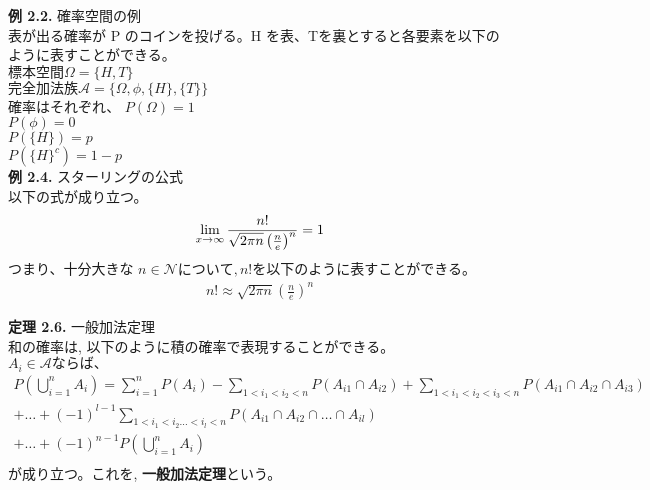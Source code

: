 \documentclass[dvipdfmx,10pt, a4j]{jarticle}
\theoremstyle{definition}
\begin{document}
    \newpage
    \noindent
    \textbf{例 2.2.} 確率空間の例\\
    表が出る確率が P のコインを投げる。H を表、Tを裏とすると各要素を以下のように表すことができる。\\
    $標本空間 \Omega = \{ H, T \}$\\
    $完全加法族 \mathcal{A} = \{ \Omega, \phi, \{H\}, \{T\} \}$\\

    確率はそれぞれ、
    $P(\Omega) = 1$\\
    $P(\phi) = 0$\\
    $P(\{H\}) = p$\\
    $P(\{H\}^{c}) = 1-p$\\

    \noindent
    \textbf{例 2.4.} スターリングの公式\\
    以下の式が成り立つ。\\
    \[
        \lim_{x \to \infty} \frac{n!}{\sqrt{2 \pi n}\left(\frac{n}{e}\right)^{n}} = 1\\
    \]
    つまり、十分大きな $n \in \mathcal{N} について, n!$を以下のように表すことができる。
    \begin{align}
        n! \approx \sqrt{2 \pi n}\left(\frac{n}{e}\right)^{n}
    \end{align}

    \noindent
    \textbf{定理 2.6.} 一般加法定理\\
    和の確率は, 以下のように積の確率で表現することができる。\\
    $A_i \in \mathcal{A} ならば、$\\
    \begin{align*}
        P(\bigcup_{i=1}^{n}{A_i}) = \sum_{i = 1}^n P(A_i) - \sum_{1 < i_1 < i_2 < n} P(A_{i1} \cap A_{i2}) + \sum_{1 < i_1 < i_2 < i_3 < n} P(A_{i1} \cap A_{i2} \cap A_{i3}) \\
        + \dots + (-1)^{l-1} \sum_{1 < i_1 < i_2 \dots < i_l < n} P(A_{i1} \cap A_{i2} \cap \dots \cap A_{il})\\
        + \dots + (-1)^{n-1}P(\bigcup_{i=1}^{n}{A_i})\\
    \end{align*}
    が成り立つ。これを, \textbf{一般加法定理}という。
\end{document}
